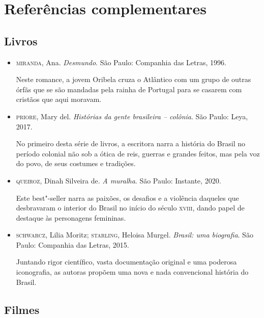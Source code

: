 \documentclass[12pt]{extarticle}
\begin{document}
\section{Referências complementares}

\subsection{Livros}

\begin{itemize}
\item\textsc{miranda}, Ana. \textit{Desmundo}. São Paulo: Companhia das Letras, 1996.

Neste romance, a jovem Oribela cruza o Atlântico com um grupo de outras
órfãs que se são mandadas pela rainha de Portugal para se casarem com
cristãos que aqui moravam.

\item\textsc{priore}, Mary del. \textit{Histórias da gente brasileira -- colônia}. São Paulo: Leya, 2017.

No primeiro desta série de livros, a escritora narra a história do
Brasil no período colonial não sob a ótica de reis, guerras e grandes
feitos, mas pela voz do povo, de seus costumes e tradições.

\item\textsc{queiroz}, Dinah Silveira de. \textit{A muralha}. São Paulo: Instante,
2020.

Este best"-seller narra as paixões, os desafios e a violência daqueles
que desbravaram o interior do Brasil no início do século \textsc{xviii}, dando
papel de destaque às personagens femininas.

\item\textsc{schwarcz}, Lilia Moritz; \textsc{starling}, Heloisa Murgel. \textit{Brasil: uma biografia}. São Paulo: Companhia das Letras, 2015.

Juntando rigor científico, vasta documentação original e uma poderosa
iconografia, as autoras propõem uma nova e nada convencional história do
Brasil.
\end{itemize}

\subsection{Filmes}
\end{document}

